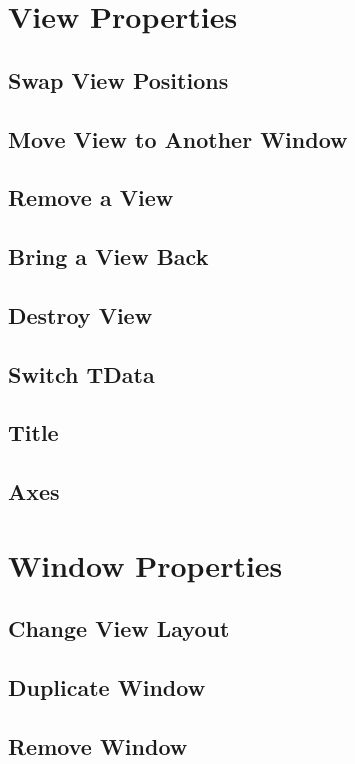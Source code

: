 \newpage

\section{View Properties}

\subsection{Swap View Positions}
\subsection{Move View to Another Window}
\subsection{Remove a View}
\subsection{Bring a View Back}
\subsection{Destroy View}
\subsection{Switch TData}
\subsection{Title}
\subsection{Axes}

\section{Window Properties}

\subsection{Change View Layout}
\subsection{Duplicate Window}
\subsection{Remove Window}


